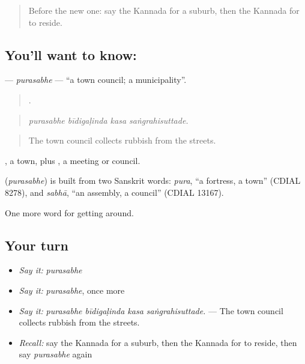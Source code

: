 \label{lesson:KA-C466-purasabhe}



\begin{quote}
Before the new one: say the Kannada for a suburb, then the Kannada for to reside.
\end{quote}

\subsection*{You'll want to know: }
\textbf{} — \emph{purasabhe} — \textquotedblleft{}a town council; a municipality\textquotedblright{}.

\begin{quote}
   .
\end{quote}

\begin{quote}
\emph{purasabhe bīdigaḷinda kasa saṅgrahisuttade.}
\end{quote}

\begin{quote}
The town council collects rubbish from the streets.
\end{quote}

, a town, plus , a meeting or council.

\begin{cousinweb}
\textbf{} (\emph{purasabhe}) is built from two Sanskrit words: \emph{pura}, \textquotedblleft{}a fortress, a town\textquotedblright{} (CDIAL 8278), and \emph{sabhā}, \textquotedblleft{}an assembly, a council\textquotedblright{} (CDIAL 13167).
\end{cousinweb}

\begin{grammarlens}[title={What you've built}]
One more word for getting around.
\end{grammarlens}

\subsection*{Your turn}
\begin{itemize}
\raggedright
  \item \emph{Say it:} \emph{purasabhe}
  \item \emph{Say it:} \emph{purasabhe}, once more
  \item \emph{Say it:} \emph{purasabhe bīdigaḷinda kasa saṅgrahisuttade.} — The town council collects rubbish from the streets.
  \item \emph{Recall:} say the Kannada for a suburb, then the Kannada for to reside, then say \emph{purasabhe} again
\end{itemize}


